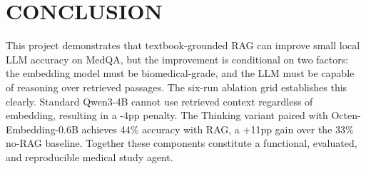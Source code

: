 \section{CONCLUSION}
This project demonstrates that textbook-grounded RAG can improve small local LLM accuracy on MedQA, but the improvement is conditional on two factors: the embedding model must be biomedical-grade, and the LLM must be capable of reasoning over retrieved passages. The six-run ablation grid establishes this clearly. Standard Qwen3-4B cannot use retrieved context regardless of embedding, resulting in a -4pp penalty. The Thinking variant paired with Octen-Embedding-0.6B achieves 44\% accuracy with RAG, a +11pp gain over the 33\% no-RAG baseline. Together these components constitute a functional, evaluated, and reproducible medical study agent.